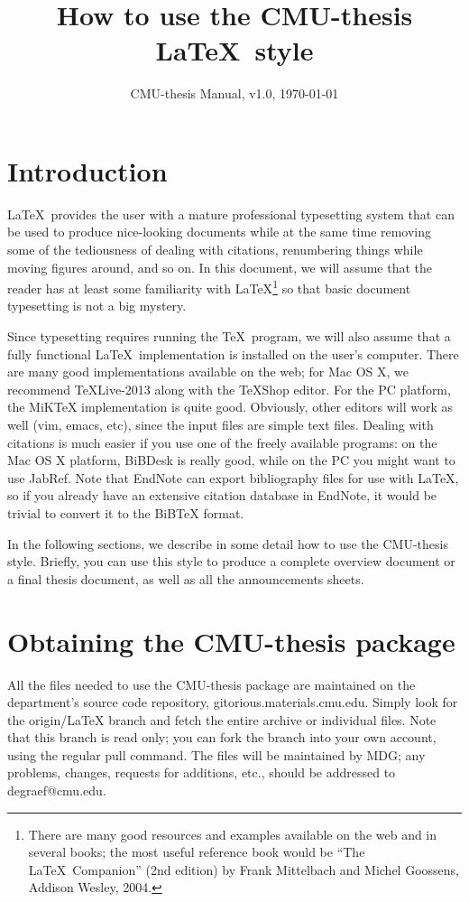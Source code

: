 \documentclass[DIV=calc, paper=letter, fontsize=11pt]{scrartcl}	 %
\title{How to use the CMU-thesis \LaTeX\ style} %
\author{\vspace*{-0.7in}} %
\date{CMU-thesis Manual, v1.0, \today}
\begin{document}
\maketitle

\renewcommand{\contentsname}{Table of Contents}
{\small\tableofcontents}


\newpage
\section{Introduction}
\LaTeX\ provides the user with a mature professional typesetting system that can be used to 
produce nice-looking documents while at the same time removing some of the tediousness of dealing
with citations, renumbering things while moving figures around, and so on.  In this document, we will assume that
the reader has at least some familiarity with \LaTeX\footnote{There are many good resources and examples available
on the web and in several books; the most useful reference book would be ``The \LaTeX\ Companion'' (2nd edition) by 
Frank Mittelbach and Michel Goossens, Addison Wesley, 2004.} so that basic document typesetting is not a big mystery.

Since typesetting requires running the \TeX\ program, we will also assume that a fully functional \LaTeX\ implementation
is installed on the user's computer.  There are many good implementations available on the web; for  
Mac OS X, we recommend \TeX Live-2013 along with the \textsf{TeXShop} editor.  For the PC platform, the \textsf{MiKTeX} implementation
is quite good.  Obviously, other editors will work as well (vim, emacs, etc), since the input files are simple text files.
Dealing with citations is much easier if you use one of the freely available programs: on the Mac OS X platform, \textsf{BiBDesk}
is really good, while on the PC you might want to use \textsf{JabRef}.  Note that \textsf{EndNote} can export bibliography
files for use with \LaTeX, so if you already have an extensive citation database in EndNote, it would be trivial to 
convert it to the BiBTeX format.

In the following sections, we describe in some detail how to use the CMU-thesis style.  Briefly, you can use this 
style to produce a complete overview document or a final thesis document, as well as all the announcements sheets.

\section{Obtaining the CMU-thesis package}
All the files needed to use the CMU-thesis package are maintained on the department's source code
repository, \textsf{gitorious.materials.cmu.edu}.  Simply look for the \textsf{origin/LaTeX} branch and fetch
the entire archive or individual files.  Note that this branch is read only; you can fork the branch into your
own account, using the regular pull command.  The files will be maintained by MDG; any problems, changes, 
requests for additions, etc., should be addressed to \textsf{degraef@cmu.edu}.
\end{document}
